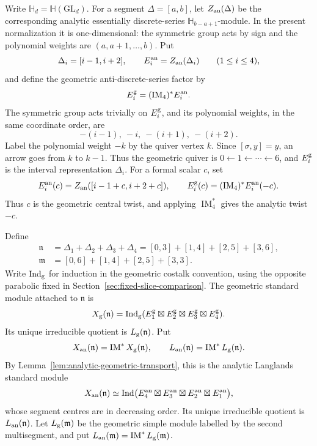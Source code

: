\documentclass[11pt]{amsart}
\theoremstyle{definition}
\theoremstyle{remark}
\newcommand{\Hh}{\mathbb H}
\begin{document}
Write $\Hh_d=\Hh(\mathrm{GL}_d)$.  For a segment
$\Delta=[a,b]$, let $Z_{\rm an}(\Delta)$ be the corresponding analytic
essentially discrete-series $\Hh_{b-a+1}$-module.  In the present
normalization it is one-dimensional: the symmetric group acts by sign and
the polynomial weights are $(a,a+1,\ldots,b)$.  Put
\[
 \Delta_i=[i-1,i+2],\qquad
 E_i^{\rm an}=Z_{\rm an}(\Delta_i)\qquad(1\leq i\leq4),
\]
and define the geometric anti-discrete-series factor by
\[
 E_i^{\rm g}=(\operatorname{IM}_4)^*E_i^{\rm an}.
\]
The symmetric group acts trivially on $E_i^{\rm g}$, and its polynomial
weights, in the same coordinate order, are
\[
 -(i-1),\ -i,\ -(i+1),\ -(i+2).
\]
Label the polynomial weight $-k$ by the quiver vertex $k$.
Since $[\sigma,y]=y$, an arrow goes from $k$ to $k-1$.
Thus the geometric quiver is $0\leftarrow1\leftarrow\cdots\leftarrow6$,
and $E_i^{\rm g}$ is the interval representation $\Delta_i$.
For a formal scalar $c$, set
\[
 E_i^{\rm an}(c)=Z_{\rm an}([i-1+c,i+2+c]),
 \qquad
 E_i^{\rm g}(c)=(\operatorname{IM}_4)^*E_i^{\rm an}(-c).
\]
Thus $c$ is the geometric central twist, and applying
$\operatorname{IM}_4^*$ gives the analytic twist $-c$.

Define
\begin{align*}
 \mathfrak n&=\Delta_1+\Delta_2+\Delta_3+\Delta_4
 =[0,3]+[1,4]+[2,5]+[3,6],\\
 \mathfrak m&=[0,6]+[1,4]+[2,5]+[3,3].
\end{align*}
Write $\operatorname{Ind}_{\rm g}$ for induction in the geometric costalk
convention, using the opposite parabolic fixed in
Section~\ref{sec:fixed-slice-comparison}.  The geometric standard module
attached to $\mathfrak n$ is
\begin{equation}\label{eq:appendix-standard-module}
 X_{\rm g}(\mathfrak n)
 =\operatorname{Ind}_{\rm g}
   (E_1^{\rm g}\boxtimes E_2^{\rm g}\boxtimes
    E_3^{\rm g}\boxtimes E_4^{\rm g}).
\end{equation}
Its unique irreducible quotient is $L_{\rm g}(\mathfrak n)$.  Put
\[
 X_{\rm an}(\mathfrak n)=\operatorname{IM}^*X_{\rm g}(\mathfrak n),
 \qquad
 L_{\rm an}(\mathfrak n)=\operatorname{IM}^*L_{\rm g}(\mathfrak n).
\]
By Lemma~\ref{lem:analytic-geometric-transport}, this is the analytic
Langlands standard module
\[
 X_{\rm an}(\mathfrak n)
 \simeq\operatorname{Ind}
 \bigl(E_4^{\rm an}\boxtimes E_3^{\rm an}\boxtimes
       E_2^{\rm an}\boxtimes E_1^{\rm an}\bigr),
\]
whose segment centres are in decreasing order.  Its unique irreducible
quotient is $L_{\rm an}(\mathfrak n)$.  Let
$L_{\rm g}(\mathfrak m)$ be the geometric simple module labelled by the
second multisegment, and put
$L_{\rm an}(\mathfrak m)=\operatorname{IM}^*L_{\rm g}(\mathfrak m)$.
\end{document}
